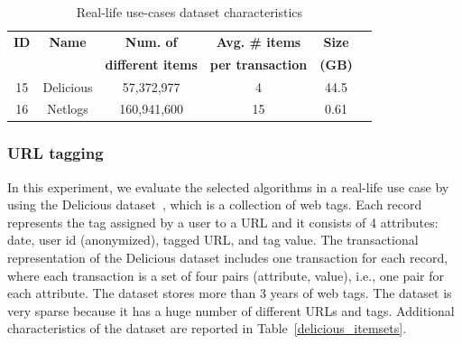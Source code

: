 \begin{table}[h!]
\scriptsize
\begin{center}
\caption{Real-life use-cases dataset characteristics}
\label{datasets_real}
\begin{tabular}{|c|c|c|c|c|c|}
\hline
{\bf ID }& {\bf Name} 	&  {\bf Num. of} 	& {\bf  Avg. \# items} 			& {\bf Size} \\
{\bf  }& {\bf  } 		&  {\bf different items} 	& {\bf  per transaction} 	& {\bf (GB) } \\
\hline
\hline
15& Delicious & 57,372,977 & 4 & 44.5 \\ \hline
16 & Netlogs & 160,941,600 & 15 & 0.61  \\ \hline
\end{tabular}
\end{center}
\end{table}





\subsubsection{URL tagging}
\label{delicious_exp}

In this experiment, we evaluate the selected algorithms in a real-life use case
by using the Delicious dataset~\cite{wetzker2008analyzing}, which is a
collection of web tags.
Each record represents the tag assigned by a user to a URL and it consists of
4 attributes:
date,
user id (anonymized),
tagged URL,
and tag value.
The transactional representation of the Delicious dataset includes
one transaction for each record, where each transaction is a set of four pairs
(attribute, value), i.e., one pair for each attribute.
The dataset stores more than 3 years of web tags.
The dataset is very sparse because it has a huge number of different URLs
and tags.
Additional characteristics of the dataset are reported
in Table~\ref{delicious_itemsets}.

